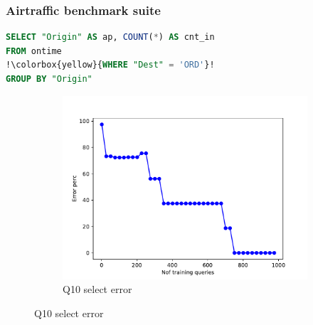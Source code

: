 \begin{frame}[fragile]
\frametitle{Airtraffic benchmark suite}
\begin{lstlisting}[basicstyle=\ttfamily\footnotesize, language=SQL, escapechar=!]
SELECT "Origin" AS ap, COUNT(*) AS cnt_in
FROM ontime
!\colorbox{yellow}{WHERE "Dest" = 'ORD'}!
GROUP BY "Origin"
\end{lstlisting}
	\begin{figure}[!htb]
	  \begin{subfigure}[t]{0.5\textwidth}
	    \includegraphics[scale=0.4]{../figs/airtraffic/airtraffic_sel10_error.pdf}
	    \caption{Q10 select error}
	    \label{fig:sel04}
	  \end{subfigure}
	\end{figure}
\end{frame}


